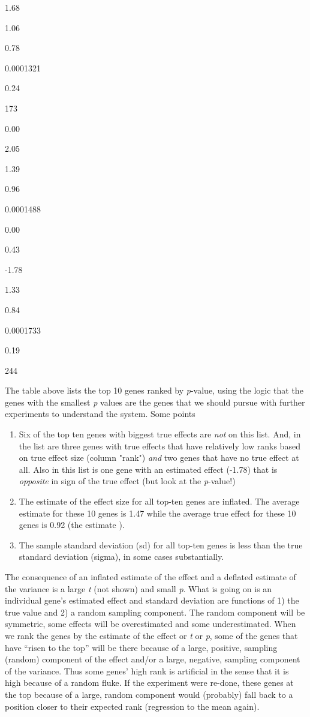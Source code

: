\documentclass[]{book}
\providecommand{\tightlist}{%
  \setlength{\itemsep}{0pt}\setlength{\parskip}{0pt}}
\begin{document}
1.68

1.06

0.78

0.0001321

0.24

173

0.00

2.05

1.39

0.96

0.0001488

0.00

0.43

-1.78

1.33

0.84

0.0001733

0.19

244

The table above lists the top 10 genes ranked by \emph{p}-value, using
the logic that the genes with the smallest \emph{p} values are the genes
that we should pursue with further experiments to understand the system.
Some points

\begin{enumerate}
\def\labelenumi{\arabic{enumi}.}
\tightlist
\item
  Six of the top ten genes with biggest true effects are \emph{not} on
  this list. And, in the list are three genes with true effects that
  have relatively low ranks based on true effect size (column "rank")
  \emph{and} two genes that have no true effect at all. Also in this
  list is one gene with an estimated effect (-1.78) that is
  \emph{opposite} in sign of the true effect (but look at the
  \emph{p}-value!)
\item
  The estimate of the effect size for all top-ten genes are inflated.
  The average estimate for these 10 genes is 1.47 while the average true
  effect for these 10 genes is 0.92 (the estimate ).
\item
  The sample standard deviation (sd) for all top-ten genes is less than
  the true standard deviation (sigma), in some cases substantially.
\end{enumerate}

The consequence of an inflated estimate of the effect and a deflated
estimate of the variance is a large \emph{t} (not shown) and small
\emph{p}. What is going on is an individual gene's estimated effect and
standard deviation are functions of 1) the true value and 2) a random
sampling component. The random component will be symmetric, some effects
will be overestimated and some underestimated. When we rank the genes by
the estimate of the effect or \emph{t} or \emph{p}, some of the genes
that have ``risen to the top'' will be there because of a large,
positive, sampling (random) component of the effect and/or a large,
negative, sampling component of the variance. Thus some genes' high rank
is artificial in the sense that it is high because of a random fluke. If
the experiment were re-done, these genes at the top because of a large,
random component would (probably) fall back to a position closer to
their expected rank (regression to the mean again).
\end{document}
